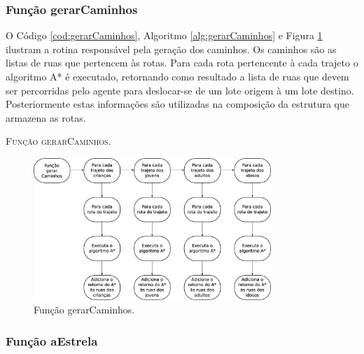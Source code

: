 \newpage

\subsubsection{Função gerarCaminhos}

O Código \ref{cod:gerarCaminhos}, Algoritmo \ref{alg:gerarCaminhos} e Figura \ref{fig:gerarCaminhos} ilustram a rotina responsável pela geração dos caminhos. Os caminhos são as listas de ruas que pertencem às rotas. Para cada rota pertencente à cada trajeto o algoritmo A* é executado, retornando como resultado a lista de ruas que devem ser percorridas pelo agente para deslocar-se de um lote origem à um lote destino. Posteriormente estas informações são utilizadas na composição da estrutura que armazena as rotas. 



\begin{algorithm}[H]
   \SetAlgoLined   
   
   \caption{\textsc{Função gerarCaminhos.}}
   \label{alg:gerarCaminhos}
\end{algorithm}

\begin{figure}[H]
  \centering
  \includegraphics[width=0.8\textwidth]{Figuras/Simula/Fluxos/gerarCaminhos.eps}
  \caption{Função gerarCaminhos.}
  \label{fig:gerarCaminhos}
\end{figure} 

\newpage

\subsubsection{Função aEstrela}

